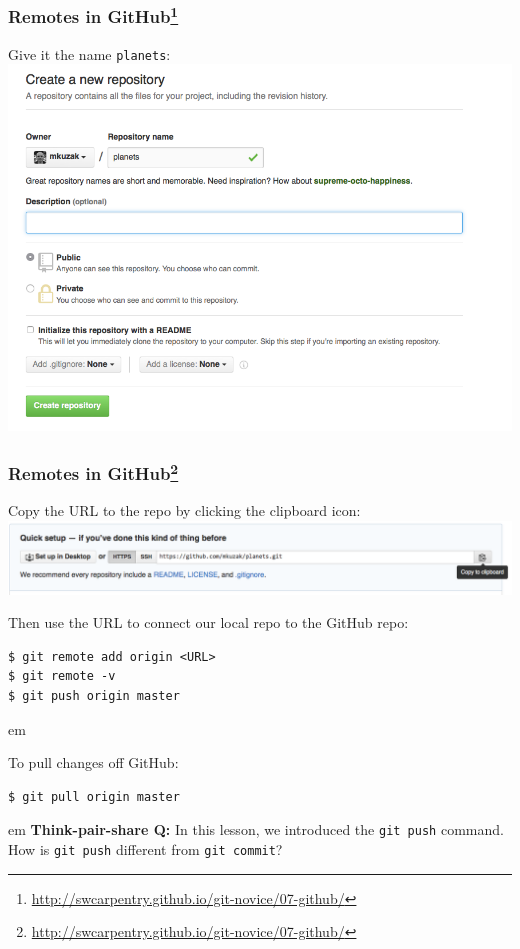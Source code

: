 \documentclass{beamer}
\begin{document}
\begin{frame}
\frametitle{Remotes in GitHub\footnote{\url{http://swcarpentry.github.io/git-novice/07-github/}}}

Give it the name \texttt{planets}:\\
\includegraphics[width=\textwidth]{github-create-repo-02.png}

\end{frame}

\begin{frame}[fragile]
\frametitle{Remotes in GitHub\footnote{\url{http://swcarpentry.github.io/git-novice/07-github/}}}
Copy the URL to the repo by clicking the clipboard icon:\\
\includegraphics[width=\textwidth]{github-find-repo-string.png}

\pause
Then use the URL to connect our local repo to the GitHub repo:
\begin{verbatim}
$ git remote add origin <URL>
$ git remote -v
$ git push origin master
\end{verbatim}
\pause
{} em

To pull changes off GitHub:
\begin{verbatim}
$ git pull origin master
\end{verbatim}

\pause
{} em
\textcolor{blue!50!black}{\textbf{Think-pair-share Q:} In this lesson, we introduced the \texttt{git push} command. How is \texttt{git push} different from \texttt{git commit}?}

\end{frame}
\end{document}
